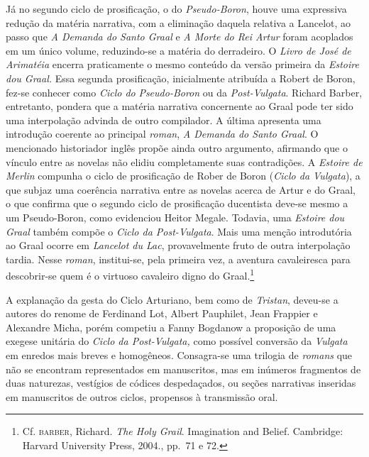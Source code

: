 Já no segundo ciclo de prosificação, o do \textit{Pseudo-Boron}, houve
uma expressiva redução da matéria narrativa, com a eliminação daquela
relativa a Lancelot, ao passo que \textit{A Demanda do Santo Graal} e
\textit{A Morte do Rei Artur} foram acoplados em um único volume,
reduzindo-se a matéria do derradeiro. O \textit{Livro de José de
Arimatéia} encerra praticamente o mesmo conteúdo da versão primeira da
\textit{Estoire dou Graal.} Essa segunda prosificação, inicialmente
atribuída a Robert de Boron, fez-se conhecer como \textit{Ciclo do}
\textit{Pseudo-Boron} ou da \textit{Post-Vulgata}. Richard Barber,
entretanto, pondera que a matéria narrativa concernente ao Graal pode
ter sido uma interpolação advinda de outro compilador. A última
apresenta uma introdução coerente ao principal \textit{roman},
\textit{A Demanda do Santo Graal}. O mencionado historiador inglês
propõe ainda outro argumento, afirmando que o vínculo entre as novelas
não elidiu completamente suas contradições. A \textit{Estoire de
Merlin} compunha o ciclo de prosificação de Rober de Boron
(\textit{Ciclo da Vulgata}), a que subjaz uma coerência narrativa entre
as novelas acerca de Artur e do Graal, o que confirma que o segundo
ciclo de prosificação ducentista deve-se mesmo a um Pseudo-Boron, como
evidenciou Heitor Megale. Todavia, uma \textit{Estoire dou Graal}
também compõe o \textit{Ciclo da Post-Vulgata}. Mais uma menção
introdutória ao Graal ocorre em \textit{Lancelot du Lac}, provavelmente
fruto de outra interpolação tardia. Nesse \textit{roman}, institui-se,
pela primeira vez, a aventura cavaleiresca para descobrir-se quem é o
virtuoso cavaleiro digno do Graal.\footnote{ Cf. \textsc{barber},
Richard.\textit{ The Holy Grail}. Imagination and Belief. Cambridge:
Harvard University Press, 2004.,  pp.~71 e 72.} 

A explanação da gesta do Ciclo Arturiano, bem como de \textit{Tristan},
deveu-se a autores do renome de Ferdinand Lot, Albert Pauphilet, Jean
Frappier e Alexandre Micha, porém competiu a Fanny Bogdanow a
proposição de uma exegese unitária do \textit{Ciclo da Post-Vulgata,}
como possível conversão da \textit{Vulgata} em enredos mais breves e
homogêneos. Consagra-se uma trilogia de \textit{romans} que não se
encontram representados em manuscritos, mas em inúmeros fragmentos de
duas naturezas, vestígios de códices despedaçados, ou seções narrativas
inseridas em manuscritos de outros ciclos, propensos à transmissão
oral.

